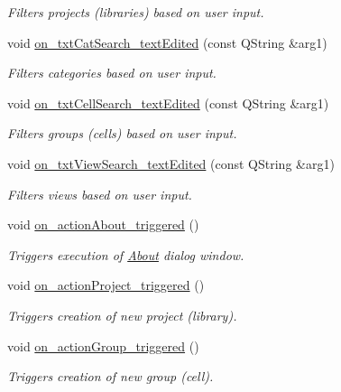\begin{DoxyCompactItemize}
\begin{DoxyCompactList}\small\item\em Filters projects (libraries) based on user input. \end{DoxyCompactList}\item 
void \hyperlink{classMainWindow_ab678d8f29e983817bedf692d399f8f22}{on\-\_\-txt\-Cat\-Search\-\_\-text\-Edited} (const Q\-String \&arg1)
\begin{DoxyCompactList}\small\item\em Filters categories based on user input. \end{DoxyCompactList}\item 
void \hyperlink{classMainWindow_aa083f16ffe18dc0d31fabece8d9decff}{on\-\_\-txt\-Cell\-Search\-\_\-text\-Edited} (const Q\-String \&arg1)
\begin{DoxyCompactList}\small\item\em Filters groups (cells) based on user input. \end{DoxyCompactList}\item 
void \hyperlink{classMainWindow_a468a4eb5ab08b6472e6c32b35490aeeb}{on\-\_\-txt\-View\-Search\-\_\-text\-Edited} (const Q\-String \&arg1)
\begin{DoxyCompactList}\small\item\em Filters views based on user input. \end{DoxyCompactList}\item 
void \hyperlink{classMainWindow_a4f3ebda1ba39e0ef4d678b44893c9c7f}{on\-\_\-action\-About\-\_\-triggered} ()
\begin{DoxyCompactList}\small\item\em Triggers execution of \hyperlink{classAbout}{About} dialog window. \end{DoxyCompactList}\item 
void \hyperlink{classMainWindow_a72557ed75b052bdf4f7f8d87b70fc579}{on\-\_\-action\-Project\-\_\-triggered} ()
\begin{DoxyCompactList}\small\item\em Triggers creation of new project (library). \end{DoxyCompactList}\item 
void \hyperlink{classMainWindow_a9a3efa0112bdda7a589525d160ca625b}{on\-\_\-action\-Group\-\_\-triggered} ()
\begin{DoxyCompactList}\small\item\em Triggers creation of new group (cell). \end{DoxyCompactList}\item 

\end{DoxyCompactItemize}

